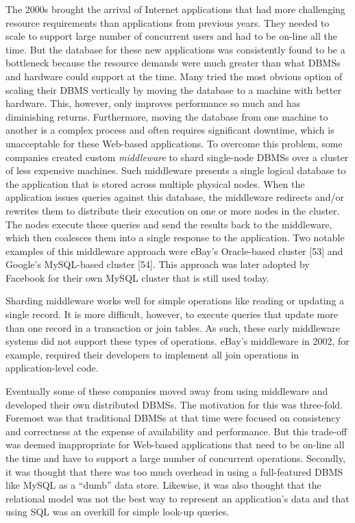 \documentclass[a4paper,11pt,twoside,openright]{article}
\begin{document}
The 2000s brought the arrival of Internet applications that had more
challenging resource requirements than applications from previous years.
They needed to scale to support large number of concurrent users and had
to be on-line all the time. But the database for these new applications
was consistently found to be a bottleneck because the resource demands
were much greater than what DBMSs and hardware could support at the
time. Many tried the most obvious option of scaling their DBMS
vertically by moving the database to a machine with better hardware.
This, however, only improves performance so much and has diminishing
returns. Furthermore, moving the database from one machine to another is
a complex process and often requires significant downtime, which is
unacceptable for these Web-based applications. To overcome this problem,
some companies created custom \emph{middleware} to shard single-node
DBMSs over a cluster of less expensive machines. Such middleware
presents a single logical database to the application that is stored
across multiple physical nodes. When the application issues queries
against this database, the middleware redirects and/or rewrites them to
distribute their execution on one or more nodes in the cluster. The
nodes execute these queries and send the results back to the middleware,
which then coalesces them into a single response to the application. Two
notable examples of this middleware approach were eBay's Oracle-based
cluster {[}53{]} and Google's MySQL-based cluster {[}54{]}. This
approach was later adopted by Facebook for their own MySQL cluster that
is still used today.

Sharding middleware works well for simple operations like reading or
updating a single record. It is more difficult, however, to execute
queries that update more than one record in a transaction or join
tables. As such, these early middleware systems did not support these
types of operations. eBay's middleware in 2002, for example, required
their developers to implement all join operations in application-level
code.

Eventually some of these companies moved away from using middleware and
developed their own distributed DBMSs. The motivation for this was
three-fold. Foremost was that traditional DBMSs at that time were
focused on consistency and correctness at the expense of availability
and performance. But this trade-off was deemed inappropriate for
Web-based applications that need to be on-line all the time and have to
support a large number of concurrent operations. Secondly, it was
thought that there was too much overhead in using a full-featured DBMS
like MySQL as a ``dumb'' data store. Likewise, it was also thought that
the relational model was not the best way to represent an application's
data and that using SQL was an overkill for simple look-up queries.
\end{document}
